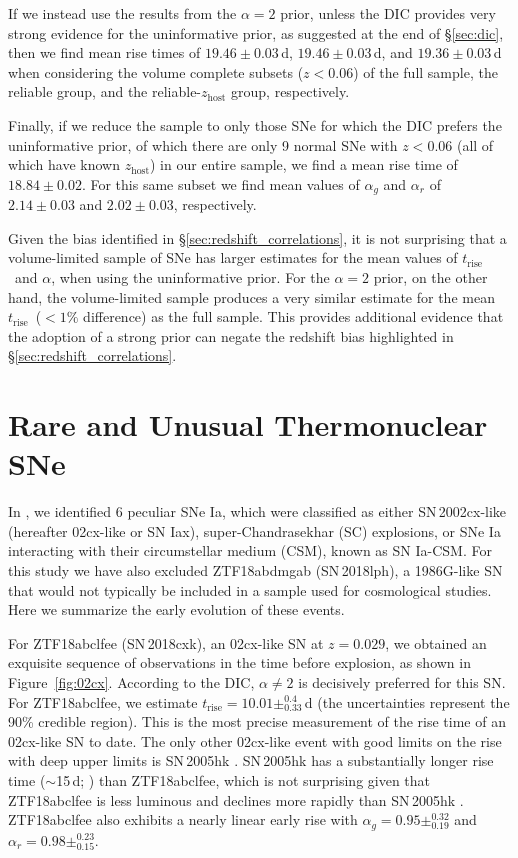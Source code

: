 \documentclass[twocolumn]{./aastex63}
\newcommand{\trise}{$t_\mathrm{rise}$}
\begin{document}
If we instead use the results from the $\alpha = 2$ prior, unless the DIC
provides very strong evidence for the uninformative prior, as suggested at the
end of \S\ref{sec:dic}, then we find mean rise times of $19.46 \pm 0.03$\,d,
$19.46 \pm 0.03$\,d, and $19.36 \pm 0.03$\,d when considering the volume
complete subsets ($z < 0.06$) of the full sample, the reliable group, and the
reliable-$z_\mathrm{host}$ group, respectively.

Finally, if we reduce the sample to only those SNe for which the DIC prefers
the uninformative prior, of which there are only 9 normal SNe with $z < 0.06$
(all of which have known $z_\mathrm{host}$) in our entire sample, we find a
mean rise time of $18.84 \pm 0.02$. For this same subset we find mean values
of $\alpha_g$ and $\alpha_r$ of $2.14 \pm 0.03$ and $2.02 \pm 0.03$,
respectively.

Given the bias identified in \S\ref{sec:redshift_correlations}, it is not
surprising that a volume-limited sample of SNe has larger estimates for the
mean values of \trise\ and $\alpha$, when using the uninformative prior. For
the $\alpha = 2$ prior, on the other hand, the volume-limited sample produces
a very similar estimate for the mean \trise\ ($< 1\%$ difference) as the full
sample. This provides additional evidence that the adoption of a strong prior
can negate the redshift bias highlighted in \S\ref{sec:redshift_correlations}.

\section{Rare and Unusual Thermonuclear SNe}\label{sec:rare}

In \citet{Yao19}, we identified 6 peculiar SNe Ia, which were classified as
either SN\,2002cx-like (hereafter 02cx-like or SN Iax), super-Chandrasekhar
(SC) explosions, or SNe Ia interacting with their circumstellar medium (CSM),
known as SN Ia-CSM. For this study we have also excluded ZTF18abdmgab
(SN\,2018lph), a 1986G-like SN that would not typically be included in a
sample used for cosmological studies. Here we summarize the early evolution of
these events.

For ZTF18abclfee (SN\,2018cxk), an 02cx-like SN at $z = 0.029$, we obtained an
exquisite sequence of observations in the time before explosion, as shown in
Figure~\ref{fig:02cx}. According to the DIC, $\alpha \ne 2$ is decisively
preferred for this SN. For ZTF18abclfee, we estimate \trise$ = 10.01
\pm^{0.4}_{0.33}$\,d (the uncertainties represent the 90\% credible region).
This is the most precise measurement of the rise time of an 02cx-like SN to
date. The only other 02cx-like event with good limits on the rise with deep
upper limits is SN\,2005hk \citep{Phillips07}. SN\,2005hk has a substantially
longer rise time ($\sim$15\,d; \citealt{Phillips07}) than ZTF18abclfee, which
is not surprising given that ZTF18abclfee is less luminous and declines more
rapidly than SN\,2005hk \citep{Miller17a,Yao19}. ZTF18abclfee also exhibits a
nearly linear early rise with $\alpha_g = 0.95 \pm^{0.32}_{0.19}$ and
$\alpha_r = 0.98 \pm^{0.23}_{0.15}$.
\end{document}
